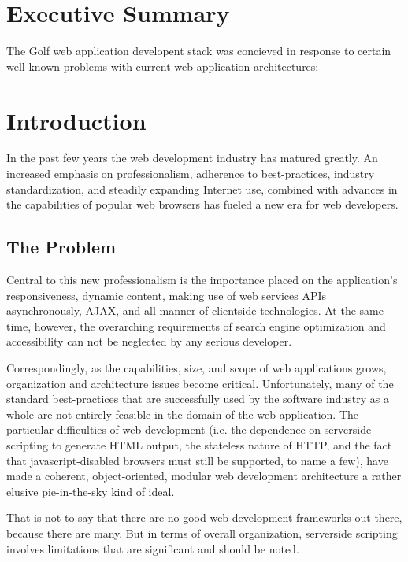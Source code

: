 \section{Executive Summary}

The Golf web application developent stack was concieved in response
to certain well-known problems with current web application
architectures:

\begin{itemize}
\end{itemize}

\section{Introduction}

In the past few years the web development industry has matured
greatly.  An increased emphasis on professionalism, adherence to
best-practices, industry standardization, and steadily expanding
Internet use, combined with advances in the capabilities of popular
web browsers has fueled a new era for web developers.

\subsection{The Problem}

Central to this new professionalism is the importance placed on the
application's responsiveness, dynamic content, making use of web
services APIs asynchronously, AJAX, and all manner of clientside
technologies. At the same time, however, the overarching requirements
of search engine optimization and accessibility can not be neglected
by any serious developer.

Correspondingly, as the capabilities, size, and scope of web
applications grows, organization and architecture issues become
critical. Unfortunately, many of the standard best-practices that are
successfully used by the software industry as a whole are not entirely
feasible in the domain of the web application. The particular
difficulties of web development (i.e. the dependence on serverside
scripting to generate HTML output, the stateless nature of HTTP, and
the fact that javascript-disabled browsers must still be supported, to
name a few), have made a coherent, object-oriented, modular web
development architecture a rather elusive pie-in-the-sky kind of
ideal.

That is not to say that there are no good web development frameworks
out there, because there are many. But in terms of overall
organization, serverside scripting involves limitations that are
significant and should be noted.

